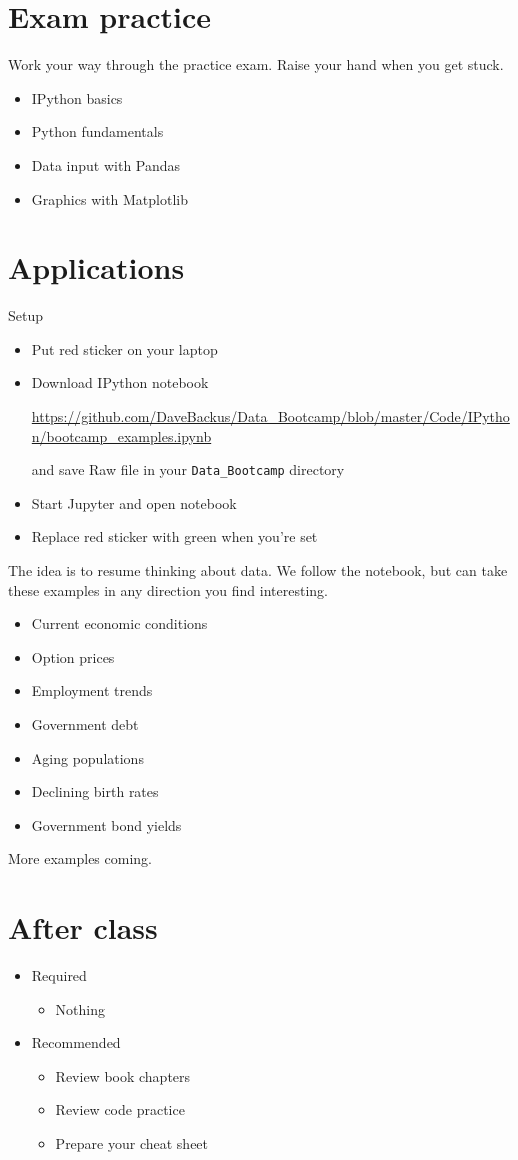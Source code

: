 \documentclass[11pt]{article}
\begin{document}
\section*{Exam practice}

Work your way through the practice exam.  Raise your hand when you get stuck.
\begin{itemize}
\item IPython basics
\item Python fundamentals
\item Data input with Pandas
\item Graphics with Matplotlib
\end{itemize}


\section*{Applications}

{Setup}
\begin{itemize}
\item Put red sticker on your laptop

\item Download IPython notebook

\url{https://github.com/DaveBackus/Data_Bootcamp/blob/master/Code/IPython/bootcamp_examples.ipynb} %

and save Raw file in your \verb|Data_Bootcamp| directory
\item Start Jupyter and open notebook
\item Replace red sticker with green when you're set
\end{itemize}

The idea is to resume thinking about data.
We follow the notebook, but can take these examples in any direction you find interesting.  
\begin{itemize}
\item Current economic conditions
\item Option prices
\item Employment trends
\item Government debt
\item Aging populations
\item Declining birth rates
\item Government bond yields
\end{itemize}
More examples coming.

\section*{After class}

\begin{itemize}
\item Required
\begin{itemize}
\item Nothing
\end{itemize}
\item Recommended
\begin{itemize}
\item Review book chapters
\item Review code practice
\item Prepare your cheat sheet
\end{itemize}
\end{itemize}


\end{document}
